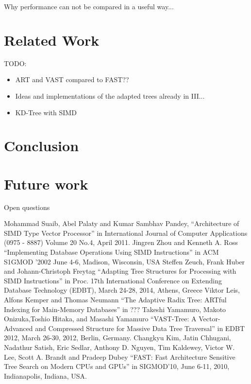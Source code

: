 \documentclass[conference]{IEEEtran}
\begin{document}
Why performance can not be compared in a useful way...

\section{Related Work}
TODO:
\begin{itemize}
	\item ART and VAST compared to FAST??
	\item Ideas and implementations of the adapted trees already in III...
	\item KD-Tree with SIMD
\end{itemize}

\section{Conclusion}

\section{Future work}
Open questions
\begin{thebibliography}{00}
Mohammad Suaib, Abel Palaty and Kumar Sambhav Pandey, ``Architecture of SIMD Type Vector Processor'' in International Journal of Computer Applications (0975 - 8887) Volume 20 No.4, April 2011.
 Jingren Zhou and Kenneth A. Ross  ``Implementing Database Operations Using SIMD Instructions'' in ACM S1GMOD '2002 June 4-6, Madison, Wisconsin, USA
 Steffen Zeuch, Frank Huber and Johann-Christoph Freytag  ``Adapting Tree Structures for Processing with SIMD Instructions'' in Proc. 17th International Conference on Extending Database Technology (EDBT), March 24-28, 2014, Athens, Greece
 Viktor Leis, Alfons Kemper and Thomas Neumann ``The Adaptive Radix Tree: ARTful Indexing for Main-Memory Databases'' in ???
 Takeshi Yamamuro, Makoto Onizuka,Toshio Hitaka, and Masashi Yamamuro ``VAST-Tree: A Vector-Advanced and Compressed Structure for Massive Data Tree Traversal'' in EDBT 2012, March 26-30, 2012, Berlin, Germany.
 Changkyu Kim, Jatin Chhugani, Nadathur Satish, Eric Sedlar, Anthony D. Nguyen,
Tim Kaldewey, Victor W. Lee, Scott A. Brandt and Pradeep Dubey ``FAST: Fast Architecture Sensitive Tree Search
on Modern CPUs and GPUs'' in SIGMOD’10, June 6-11, 2010, Indianapolis, Indiana, USA.
\end{thebibliography}
\end{document}

